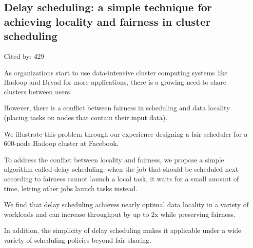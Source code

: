 \documentclass[a4paper,11pt]{article}
\begin{document}
\subsection*{Delay scheduling: a simple technique for achieving locality and fairness in cluster scheduling}
{\color{cyan} {\color{magenta} Cited by: 429}

As organizations start to use data-intensive cluster computing systems 
like Hadoop and Dryad 
for more applications,
there is a growing need to share clusters between users.

However, 
there is a conflict between 
fairness in scheduling and 
data locality (placing tasks on nodes that contain their input data). 

We illustrate this problem 
through our experience designing a fair scheduler for a 600-node Hadoop cluster at Facebook. 

To address the conflict between locality and fairness, 
we propose 
a simple algorithm called 
{\color{black} delay scheduling\cite{delay}}: 
when the job that should be scheduled next according to fairness cannot launch a local task, 
it waits for a small amount of time, letting other jobs launch tasks instead.

We find that 
delay scheduling 
achieves nearly optimal data locality in a variety of workloads and can 
increase throughput by up to 2x while preserving fairness. 

In addition, the
simplicity of delay scheduling makes it 
applicable under a wide variety of scheduling policies beyond fair sharing.	

}
\end{document}
